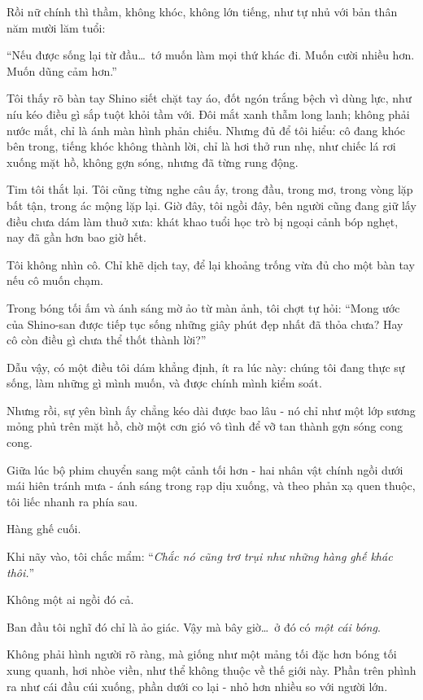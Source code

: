 \documentclass[../main.tex]{subfiles}
\begin{document}
Rồi nữ chính thì thầm, không khóc, không lớn tiếng, như tự nhủ với bản thân năm mười lăm tuổi:

\begin{center}
  ``Nếu được sống lại từ đầu\dots\ tớ muốn làm mọi thứ khác đi. Muốn cười nhiều hơn. Muốn dũng cảm hơn.''
\end{center}

Tôi thấy rõ bàn tay Shino siết chặt tay áo, đốt ngón trắng bệch vì dùng lực, như níu kéo điều gì sắp tuột khỏi tầm với. Đôi mắt xanh thẫm long lanh; không phải nước mắt, chỉ là ánh màn hình phản chiếu. Nhưng đủ để tôi hiểu: cô đang khóc bên trong, tiếng khóc không thành lời, chỉ là hơi thở run nhẹ, như chiếc lá rơi xuống mặt hồ, không gợn sóng, nhưng đã từng rung động.

Tim tôi thắt lại. Tôi cũng từng nghe câu ấy, trong đầu, trong mơ, trong vòng lặp bất tận, trong ác mộng lặp lại. Giờ đây, tôi ngồi đây, bên người cũng đang giữ lấy điều chưa dám làm thuở xưa: khát khao tuổi học trò bị ngoại cảnh bóp nghẹt, nay đã gần hơn bao giờ hết.

Tôi không nhìn cô. Chỉ khẽ dịch tay, để lại khoảng trống vừa đủ cho một bàn tay nếu cô muốn chạm.

Trong bóng tối ấm và ánh sáng mờ ảo từ màn ảnh, tôi chợt tự hỏi: ``Mong ước của Shino-san được tiếp tục sống những giây phút đẹp nhất đã thỏa chưa? Hay cô còn điều gì chưa thể thốt thành lời?''

Dẫu vậy, có một điều tôi dám khẳng định, ít ra lúc này: chúng tôi đang thực sự sống, làm những gì mình muốn, và được chính mình kiểm soát.

Nhưng rồi, sự yên bình ấy chẳng kéo dài được bao lâu - nó chỉ như một lớp sương mỏng phủ trên mặt hồ, chờ một cơn gió vô tình để vỡ tan thành gợn sóng cong cong.

Giữa lúc bộ phim chuyển sang một cảnh tối hơn - hai nhân vật chính ngồi dưới mái hiên tránh mưa - ánh sáng trong rạp dịu xuống, và theo phản xạ quen thuộc, tôi liếc nhanh ra phía sau.

Hàng ghế cuối.

Khi nãy vào, tôi chắc mẩm: ``\textit{Chắc nó cũng trơ trụi như những hàng ghế khác thôi.}''

Không một ai ngồi đó cả.

Ban đầu tôi nghĩ đó chỉ là ảo giác. Vậy mà bây giờ\dots\ ở đó có \emph{một cái bóng}.

Không phải hình người rõ ràng, mà giống như một mảng tối đặc hơn bóng tối xung quanh, hơi nhòe viền, như thể không thuộc về thế giới này. Phần trên phình ra như cái đầu cúi xuống, phần dưới co lại - nhỏ hơn nhiều so với người lớn.
\end{document}
